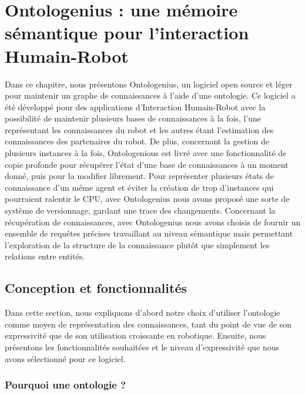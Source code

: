 \section*{Ontologenius : une mémoire sémantique pour l'interaction Humain-Robot}

Dans ce chapitre, nous présentons Ontologenius, un logiciel open source et léger pour maintenir un graphe de connaissances à l'aide d'une ontologie. Ce logiciel a été développé pour des applications d'Interaction Humain-Robot avec la possibilité de maintenir plusieurs bases de connaissances à la fois, l'une représentant les connaissances du robot et les autres étant l'estimation des connaissances des partenaires du robot. De plus, concernant la gestion de plusieurs instances à la fois, Ontologenious est livré avec une fonctionnalité de copie profonde pour récupérer l'état d'une base de connaissances à un moment donné, puis pour la modifier librement. Pour représenter plusieurs états de connaissance d'un même agent et éviter la création de trop d'instances qui pourraient ralentir le CPU, avec Ontologenius nous avons proposé une sorte de système de versionnage, gardant une trace des changements. Concernant la récupération de connaissances, avec Ontologenius nous avons choisis de fournir un ensemble de requêtes précises travaillant au niveau sémantique mais permettant l'exploration de la structure de la connaissance plutôt que simplement les relations entre entités.

\subsection*{Conception et fonctionnalités}

Dans cette section, nous expliquons d'abord notre choix d'utiliser l'ontologie comme moyen de représentation des connaissances, tant du point de vue de son expressivité que de son utilisation croissante en robotique. Ensuite, nous présentons les fonctionnalités souhaitées et le niveau d'expressivité que nous avons sélectionné pour ce logiciel.

\subsubsection*{Pourquoi une ontologie ?}

